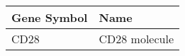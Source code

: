 \begin{tabular}{ll}
\toprule
Gene Symbol &          Name \\
\midrule
       CD28 & CD28 molecule \\
\bottomrule
\end{tabular}
